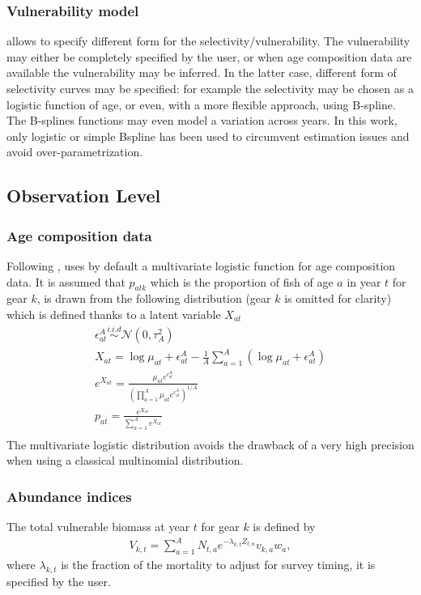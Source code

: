 \subsubsection{Vulnerability model}
\label{sec:vulnerability}
\iscam    allows     to    specify    different    form     for    the
selectivity/vulnerability. The vulnerability  may either be completely
specified by the user, or when  age composition data are available the
vulnerability may be  inferred. In the latter case,  different form of
selectivity curves may be specified:  for example the selectivity may be
chosen as a logistic function of age, or even, with a more flexible approach, using B-spline.  The B-splines
functions may  even model a  variation across years. In  this work,
only logistic or simple Bspline has been used to circumvent estimation issues and avoid over-parametrization.


\subsection{Observation Level}
\subsubsection{Age composition data}

Following  \cite{Schnute+95}, \iscam  uses by  default a  multivariate
logistic  function  for  age  composition data.  It  is  assumed  that
$p_{atk}$ which is the  proportion of fish of age $a$  in year $t$ for
gear $k$, is drawn from the following distribution (gear $k$ is omitted
for clarity) which is defined thanks to a latent variable $X_{at}$
\begin{gather}
\epsilon^{A}_{at} \overset{i.i.d}{\sim} \mathcal{N}(0,\tau^2_A)\nonumber \\ 
X_{at}       =       \log{\mu_{at}}       +       \epsilon_{at}^A       -
\frac{1}{A}\sum_{a=1}^A\left(\log{\mu_{at}} + \epsilon_{at}^A \right) \nonumber \\
e^{X_{at}} = \frac{\mu_{at}e^{\epsilon_{at}^A}}{ \left(\prod_{a=1}^A \mu_{at}e^{\epsilon_{at}^A}\right) ^{1/A}}\nonumber\\
p_{at} = \frac{e^{X_{at}} } {\sum_{a=1}^A e^{X_{at}} }\\
\label{equa:multivar}
\end{gather}
The multivariate logistic distribution  avoids the drawback of a very high
precision when using a classical multinomial distribution.

\subsubsection{Abundance indices}
The total vulnerable biomass at year $t$ for gear $k$ is defined by
\begin{gather}
V_{k,t}=\sum_{a=1}^A N_{t,a} e^{-\lambda_{k,t} Z_{t,a}} v_{k,a} w_a,
\end{gather}
 where $\lambda_{k,t}$ is the fraction  of the mortality to adjust for
 survey timing, it is specified by the user.

